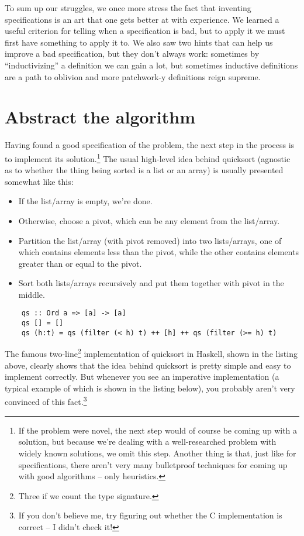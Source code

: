 \documentclass[declaration,mgr,english,shortabstract]{iithesis}
\begin{document}
To sum up our struggles, we once more stress the fact that inventing specifications is an art that one gets better at with experience. We learned a useful criterion for telling when a specification is bad, but to apply it we must first have something to apply it to. We also saw two hints that can help us improve a bad specification, but they don't always work: sometimes by ``inductivizing'' a definition we can gain a lot, but sometimes inductive definitions are a path to oblivion and more patchwork-y definitions reign supreme.

\chapter{Abstract the algorithm} \label{template}

Having found a good specification of the problem, the next step in the process is to implement its solution.\footnote{If the problem were novel, the next step would of course be coming up with a solution, but because we're dealing with a well-researched problem with widely known solutions, we omit this step. Another thing is that, just like for specifications, there aren't very many bulletproof techniques for coming up with good algorithms -- only heuristics.} The usual high-level idea behind quicksort (agnostic as to whether the thing being sorted is a list or an array) is usually presented somewhat like this:

\begin{itemize}
    \item If the list/array is empty, we're done.
    \item Otherwise, choose a pivot, which can be any element from the list/array.
    \item Partition the list/array (with pivot removed) into two lists/arrays, one of which contains elements less than the pivot, while the other contains elements greater than or equal to the pivot.
    \item Sort both lists/arrays recursively and put them together with pivot in the middle.
\end{itemize}

\begin{verbatim}
    qs :: Ord a => [a] -> [a]
    qs [] = []
    qs (h:t) = qs (filter (< h) t) ++ [h] ++ qs (filter (>= h) t)
\end{verbatim}

The famous two-line\footnote{Three if we count the type signature.} implementation of quicksort in Haskell, shown in the listing above, clearly shows that the idea behind quicksort is pretty simple and easy to implement correctly. But whenever you see an imperative implementation (a typical example of which is shown in the listing below), you probably aren't very convinced of this fact.\footnote{If you don't believe me, try figuring out whether the C implementation is correct -- I didn't check it!}
\end{document}
